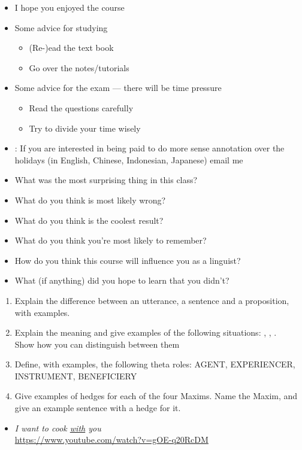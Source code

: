 \documentclass[headrule,footrule]{foils}
\begin{document}

\begin{itemize}
\item I hope you enjoyed the course
\item Some advice for studying
  \begin{itemize}
  \item (Re-)ead the text book
  \item Go over the notes/tutorials
\end{itemize}
\item Some advice for the exam --- there will be time pressure
  \begin{itemize}
  \item Read the questions carefully
  \item Try to divide your time wisely
  \end{itemize}
\item {}: If you are interested in
  being paid to do more sense annotation over the holidays (in
  English, Chinese, Indonesian, Japanese) email
  me
\end{itemize}

\begin{itemize}
\item What was the most surprising thing in this class?
\item What do you think is most likely wrong?
\item What do you think is the coolest result?
\item What do you think you’re most likely to
remember?
\item How do you think this course will influence you as a linguist?
\item What (if anything) did you hope to learn that you didn't?
\end{itemize}



\begin{enumerate}
\item Explain the difference between an utterance, a sentence and a
  proposition, with examples.
\item Explain the meaning and give examples of the following situations:
  , , .
\\ Show how you can distinguish between them
\item Define, with examples, the following theta roles: AGENT,
  EXPERIENCER, INSTRUMENT, BENEFICIERY
\item Give examples of hedges for each of the four Maxims.  Name the
  Maxim, and give an example sentence with a  hedge for it.

\end{enumerate}



\begin{itemize}
\item \textit{I want to cook \url{with} you}
\\ \url{https://www.youtube.com/watch?v=gOE-q20RcDM}
\end{itemize}


\newpage
~~
\bigskip\bigskip\bigskip\bigskip
\begin{center}
  \huge {}
\end{center}
\end{document}
